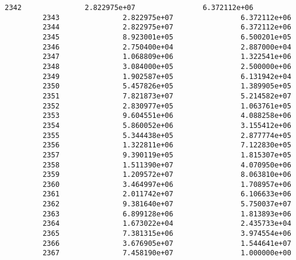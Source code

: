 \documentclass[11pt]{article}
\begin{document}
\begin{Verbatim}[commandchars=\\\{\}]
         2342               2.822975e+07                6.372112e+06   
         2343               2.822975e+07                6.372112e+06   
         2344               2.822975e+07                6.372112e+06   
         2345               8.923001e+05                6.500201e+05   
         2346               2.750400e+04                2.887000e+04   
         2347               1.068809e+06                1.322541e+06   
         2348               3.084000e+05                2.500000e+06   
         2349               1.902587e+05                6.131942e+04   
         2350               5.457826e+05                1.389905e+05   
         2351               7.821873e+07                5.214582e+07   
         2352               2.830977e+05                1.063761e+05   
         2353               9.604551e+06                4.088258e+06   
         2354               5.860052e+06                3.155412e+06   
         2355               5.344438e+05                2.877774e+05   
         2356               1.322811e+06                7.122830e+05   
         2357               9.390119e+05                1.815307e+05   
         2358               1.511390e+07                4.070950e+06   
         2359               1.209572e+07                8.063810e+06   
         2360               3.464997e+06                1.708957e+06   
         2361               2.011742e+07                6.106633e+06   
         2362               9.381640e+07                5.750037e+07   
         2363               6.899128e+06                1.813893e+06   
         2364               1.673022e+04                2.435733e+04   
         2365               7.381315e+06                3.974554e+06   
         2366               3.676905e+07                1.544641e+07   
         2367               7.458190e+07                1.000000e+00   
         

\end{Verbatim}
\end{document}
